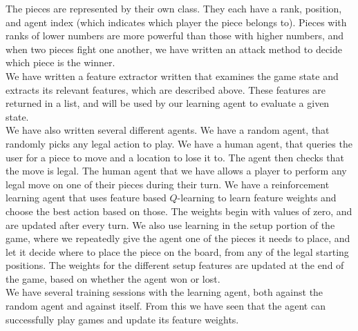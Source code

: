\documentclass[letterpaper]{article}
\begin{document}
The pieces are represented by their own class. They each have a rank, position, and agent index (which indicates which player the piece belongs to). Pieces with ranks of lower numbers are more powerful than those with higher numbers, and when two pieces fight one another, we have written an attack method to decide which piece is the winner.\\

We have written a feature extractor written that examines the game state and extracts its relevant features, which are described above. These features are returned in a list, and will be used by our learning agent to evaluate a given state.\\

We have also written several different agents. We have a random agent, that randomly picks any legal action to play. We have a human agent, that queries the user for a piece to move and a location to lose it to. The agent then checks that the move is legal. The human agent that we have allows a player to perform any legal move on one of their pieces during their turn. We have a reinforcement learning agent that uses feature based $Q$-learning to learn feature weights and choose the best action based on those. The weights begin with values of zero, and are updated after every turn. We also use learning in the setup portion of the game, where we repeatedly give the agent one of the pieces it needs to place, and let it decide where to place the piece on the board, from any of the legal starting positions. The weights for the different setup features are updated at the end of the game, based on whether the agent won or lost.\\

We have several training sessions with the learning agent, both against the random agent and against itself. From this we have seen that the agent can successfully play games and update its feature weights.

%
\end{document}
